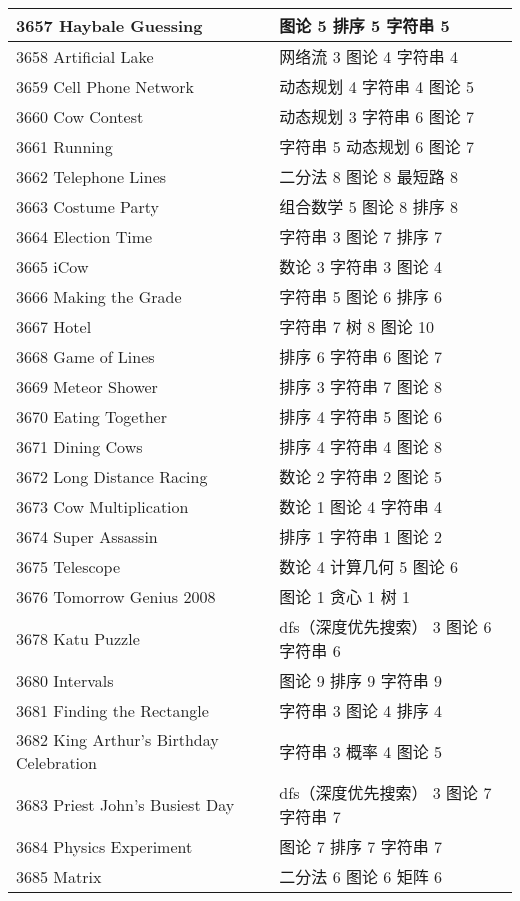 \begin{longtable}{| p{} | p{} |}
 3657 Haybale Guessing  & 图论 5 排序 5 字符串 5 \\ \hline
 3658 Artificial Lake  & 网络流 3 图论 4 字符串 4 \\ \hline
 3659 Cell Phone Network  & 动态规划 4 字符串 4 图论 5 \\ \hline
 3660 Cow Contest  & 动态规划 3 字符串 6 图论 7 \\ \hline
 3661 Running  & 字符串 5 动态规划 6 图论 7 \\ \hline
 3662 Telephone Lines  & 二分法 8 图论 8 最短路 8 \\ \hline
 3663 Costume Party  & 组合数学 5 图论 8 排序 8 \\ \hline
 3664 Election Time  & 字符串 3 图论 7 排序 7 \\ \hline
 3665 iCow  & 数论 3 字符串 3 图论 4 \\ \hline
 3666 Making the Grade  & 字符串 5 图论 6 排序 6 \\ \hline
 3667 Hotel  & 字符串 7 树 8 图论 10 \\ \hline
 3668 Game of Lines  & 排序 6 字符串 6 图论 7 \\ \hline
 3669 Meteor Shower  & 排序 3 字符串 7 图论 8 \\ \hline
 3670 Eating Together  & 排序 4 字符串 5 图论 6 \\ \hline
 3671 Dining Cows  & 排序 4 字符串 4 图论 8 \\ \hline
 3672 Long Distance Racing  & 数论 2 字符串 2 图论 5 \\ \hline
 3673 Cow Multiplication  & 数论 1 图论 4 字符串 4 \\ \hline
 3674 Super Assassin  & 排序 1 字符串 1 图论 2 \\ \hline
 3675 Telescope  & 数论 4 计算几何 5 图论 6 \\ \hline
 3676 Tomorrow Genius 2008  & 图论 1 贪心 1 树 1 \\ \hline
 3678 Katu Puzzle  & dfs（深度优先搜索） 3 图论 6 字符串 6 \\ \hline
 3680 Intervals  & 图论 9 排序 9 字符串 9 \\ \hline
 3681 Finding the Rectangle  & 字符串 3 图论 4 排序 4 \\ \hline
 3682 King Arthur's Birthday Celebration  & 字符串 3 概率 4 图论 5 \\ \hline
 3683 Priest John's Busiest Day  & dfs（深度优先搜索） 3 图论 7 字符串 7 \\ \hline
 3684 Physics Experiment  & 图论 7 排序 7 字符串 7 \\ \hline
 3685 Matrix  & 二分法 6 图论 6 矩阵 6 \\ \hline

\end{longtable}
